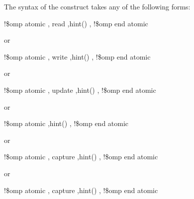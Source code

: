 \begin{fortranspecific}
The syntax of the  construct takes any of the following forms: 

\begin{boxedcode}
!\$omp atomic \plc{[memory-order-clause[},\plc{]]} read \plc{[[},\plc{]}hint()\plc{]} 
           \plc{[[},\plc{]memory-order-clause]} 
\plc{[}!\$omp end atomic\plc{]}
\end{boxedcode}

or

\begin{boxedcode}
!\$omp atomic \plc{[memory-order-clause[},\plc{]]} write \plc{[[},\plc{]}hint()\plc{]} 
           \plc{[[},\plc{]memory-order-clause]}
\plc{[}!\$omp end atomic\plc{]}
\end{boxedcode}

or

\begin{boxedcode}
!\$omp atomic \plc{[memory-order-clause[},\plc{]]} update \plc{[[},\plc{]}hint()\plc{]} 
           \plc{[[},\plc{]memory-order-clause]}
\plc{[}!\$omp end atomic\plc{]}
\end{boxedcode}

or

\begin{boxedcode}
!\$omp atomic  \plc{[[},\plc{]}hint()\plc{]} 
           \plc{[[},\plc{]memory-order-clause]}
\plc{[}!\$omp end atomic\plc{]}
\end{boxedcode}

or

\begin{boxedcode}
!\$omp atomic \plc{[memory-order-clause[},\plc{]]} capture \plc{[[},\plc{]}hint()\plc{]}
           \plc{[[},\plc{]memory-order-clause]}
!\$omp end atomic
\end{boxedcode}

or

\begin{boxedcode}
!\$omp atomic \plc{[memory-order-clause[},\plc{]]} capture \plc{[[},\plc{]}hint()\plc{]} 
           \plc{[[},\plc{]memory-order-clause]}
!\$omp end atomic
\end{boxedcode}


\end{fortranspecific}

